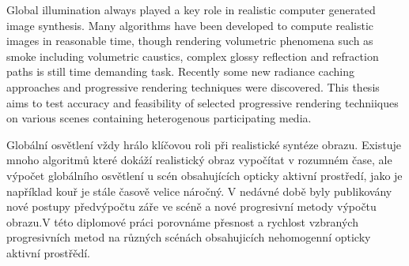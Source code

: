  
\abstractpage
\label{abstract}
Global illumination always played a key role in realistic computer generated image synthesis. Many algorithms have been developed to compute realistic images in reasonable time, though rendering volumetric phenomena such as smoke including volumetric caustics, complex glossy reflection and refraction paths is still time demanding task. Recently some new radiance caching approaches and progressive rendering techniques were discovered. This thesis aims to test accuracy and feasibility of selected progressive rendering techniiques on various scenes containing heterogenous participating media. 


\baselineskip

\noindent
Globální osvětlení vždy hrálo klíčovou roli při realistické syntéze obrazu. Existuje mnoho algoritmů které dokáží realistický obraz vypočítat v rozumném čase, ale výpočet globálního osvětlení u scén obsahujících opticky aktivní prostředí, jako je například kouř je stále časově velice náročný. V nedávné době byly publikovány nové postupy předvýpočtu záře ve scéně a nové progresivní metody výpočtu obrazu.V této diplomové práci porovnáme přesnost a rychlost vzbraných progresivních metod na různých scénách obsahujicích nehomogenní opticky aktivní prostřědí.


